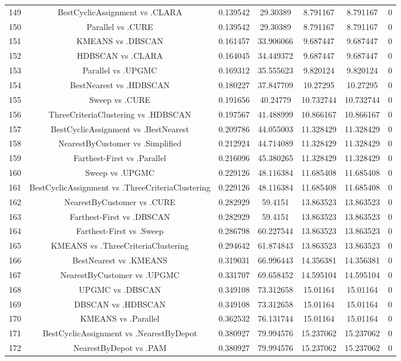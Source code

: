 \documentclass[a4paper,10pt]{article}
\begin{document}
\begin{landscape}
\begin{table}[!htp]
\begin{tabular}{ccccccc}
149&BestCyclicAssignment vs .CLARA&0.139542&29.30389&8.791167&8.791167&0\\
150&Parallel vs .CURE&0.139542&29.30389&8.791167&8.791167&0\\
151&KMEANS vs .DBSCAN&0.161457&33.906066&9.687447&9.687447&0\\
152&HDBSCAN vs .CLARA&0.164045&34.449372&9.687447&9.687447&0\\
153&Parallel vs .UPGMC&0.169312&35.555623&9.820124&9.820124&0\\
154&BestNearest vs .HDBSCAN&0.180227&37.847709&10.27295&10.27295&0\\
155&Sweep vs .CURE&0.191656&40.24779&10.732744&10.732744&0\\
156&ThreeCriteriaClustering vs .HDBSCAN&0.197567&41.488999&10.866167&10.866167&0\\
157&BestCyclicAssignment vs .BestNearest&0.209786&44.055003&11.328429&11.328429&0\\
158&NearestByCustomer vs .Simplified&0.212924&44.714089&11.328429&11.328429&0\\
159&Farthest-First vs .Parallel&0.216096&45.380265&11.328429&11.328429&0\\
160&Sweep vs .UPGMC&0.229126&48.116384&11.685408&11.685408&0\\
161&BestCyclicAssignment vs .ThreeCriteriaClustering&0.229126&48.116384&11.685408&11.685408&0\\
162&NearestByCustomer vs .CURE&0.282929&59.4151&13.863523&13.863523&0\\
163&Farthest-First vs .DBSCAN&0.282929&59.4151&13.863523&13.863523&0\\
164&Farthest-First vs .Sweep&0.286798&60.227544&13.863523&13.863523&0\\
165&KMEANS vs .ThreeCriteriaClustering&0.294642&61.874843&13.863523&13.863523&0\\
166&BestNearest vs .KMEANS&0.319031&66.996443&14.356381&14.356381&0\\
167&NearestByCustomer vs .UPGMC&0.331707&69.658452&14.595104&14.595104&0\\
168&UPGMC vs .DBSCAN&0.349108&73.312658&15.01164&15.01164&0\\
169&DBSCAN vs .HDBSCAN&0.349108&73.312658&15.01164&15.01164&0\\
170&KMEANS vs .Parallel&0.362532&76.131744&15.01164&15.01164&0\\
171&BestCyclicAssignment vs .NearestByDepot&0.380927&79.994576&15.237062&15.237062&0\\
172&NearestByDepot vs .PAM&0.380927&79.994576&15.237062&15.237062&0\\

\end{tabular}
\end{table}
\end{landscape}
\end{document}
